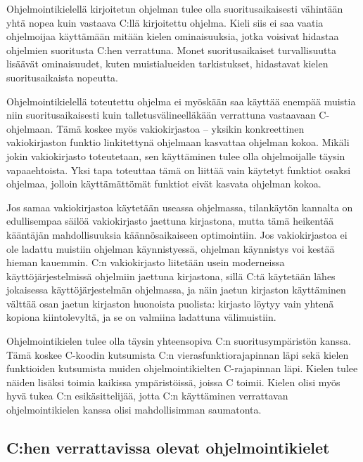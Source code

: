 \grayrule

Ohjelmointikielellä kirjoitetun ohjelman tulee olla suoritusaikaisesti
vähintään yhtä nopea kuin vastaava C:llä kirjoitettu ohjelma. Kieli siis ei saa
vaatia ohjelmoijaa käyttämään mitään kielen ominaisuuksia, jotka voisivat
hidastaa ohjelmien suoritusta C:hen verrattuna. Monet suoritusaikaiset
turvallisuutta lisäävät ominaisuudet, kuten muistialueiden tarkistukset,
hidastavat kielen suoritusaikaista nopeutta.

Ohjelmointikielellä toteutettu ohjelma ei myöskään saa käyttää enempää muistia
niin suoritusaikaisesti kuin talletusvälineelläkään verrattuna vastaavaan
C-ohjelmaan. Tämä koskee myös vakiokirjastoa --
yksikin konkreettinen vakiokirjaston funktio linkitettynä ohjelmaan kasvattaa
ohjelman kokoa. Mikäli jokin vakiokirjasto toteutetaan, sen käyttäminen tulee
olla ohjelmoijalle täysin vapaaehtoista. Yksi tapa toteuttaa tämä on liittää
vain käytetyt funktiot osaksi ohjelmaa, jolloin käyttämättömät funktiot eivät
kasvata ohjelman kokoa.

Jos samaa vakiokirjastoa käytetään useassa ohjelmassa, tilankäytön kannalta on
edullisempaa säilöä vakiokirjasto jaettuna kirjastona, mutta tämä heikentää
kääntäjän mahdollisuuksia käännösaikaiseen optimointiin. Jos vakiokirjastoa ei
ole ladattu muistiin ohjelman käynnistyessä, ohjelman käynnistys voi kestää
hieman kauemmin. C:n vakiokirjasto liitetään usein moderneissa
käyttöjärjestelmissä ohjelmiin jaettuna kirjastona, sillä C:tä käytetään lähes
jokaisessa käyttöjärjestelmän ohjelmassa, ja näin jaetun kirjaston käyttäminen
välttää osan jaetun kirjaston huonoista puolista: kirjasto löytyy vain yhtenä
kopiona kiintolevyltä, ja se on valmiina ladattuna välimuistiin.

Ohjelmointikielen tulee olla täysin yhteensopiva C:n suoritusympäristön kanssa.
Tämä koskee C-koodin kutsumista C:n vierasfunktiorajapinnan
läpi sekä kielen funktioiden kutsumista
muiden ohjelmointikielten C-rajapinnan läpi. Kielen tulee näiden lisäksi toimia
kaikissa ympäristöissä, joissa C toimii. Kielen olisi myös hyvä tukea C:n
esikäsittelijää, jotta C:n käyttäminen verrattavan ohjelmointikielen kanssa
olisi mahdollisimman saumatonta.

\subsection{C:hen verrattavissa olevat ohjelmointikielet}

